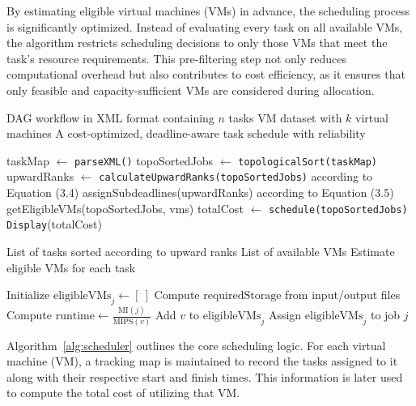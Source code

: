 \documentclass[12pt]{tcc}
\begin{document}
By estimating eligible virtual machines (VMs) in advance, the scheduling process is significantly optimized. Instead of evaluating every task on all available VMs, the algorithm restricts scheduling decisions to only those VMs that meet the task’s resource requirements. This pre-filtering step not only reduces computational overhead but also contributes to cost efficiency, as it ensures that only feasible and capacity-sufficient VMs are considered during allocation.


\begin{algorithm}[H]
\caption{Workflow Scheduling Main Procedure}
\begin{algorithmic}[1]
\Require DAG workflow in XML format containing $n$ tasks 
\Require VM dataset with $k$ virtual machines
\Ensure A cost-optimized, deadline-aware task schedule with reliability

\State taskMap $\gets$ \texttt{parseXML()}
\State topoSortedJobs $\gets$ \texttt{topologicalSort(taskMap)}
\State upwardRanks $\gets$ \texttt{calculateUpwardRanks(topoSortedJobs)} according to Equation (3.4)
\State assignSubdeadlines(upwardRanks) according to Equation (3.5)
\State getEligibleVMs(topoSortedJobs, vms)
\State totalCost $\gets$ \texttt{schedule(topoSortedJobs)}
\State \texttt{Display}(totalCost)
\end{algorithmic}
\label{alg:highlevel}
\end{algorithm}

\begin{algorithm}[H]
\caption{Eligible VM Estimation}
\label{alg:eligibleVMs}
\begin{algorithmic}[1]
\Require List of tasks sorted according to upward ranks
\Require List of available VMs
\Ensure Estimate eligible VMs for each task

    \State Initialize \( \text{eligibleVMs}_j \gets [\ ] \)
    \State Compute \( \text{requiredStorage} \) from input/output files
        \State Compute \( \text{runtime} \gets \frac{\text{MI}(j)}{\text{MIPS}(v)} \)
            \State Add \( v \) to \( \text{eligibleVMs}_j \)
        \EndIf
    \EndFor
    \State Assign \( \text{eligibleVMs}_j \) to job \( j \)
\EndFor
\end{algorithmic}
\end{algorithm}

Algorithm~\ref{alg:scheduler} outlines the core scheduling logic. For each virtual machine (VM), a tracking map is maintained to record the tasks assigned to it along with their respective start and finish times. This information is later used to compute the total cost of utilizing that VM.
\end{document}
